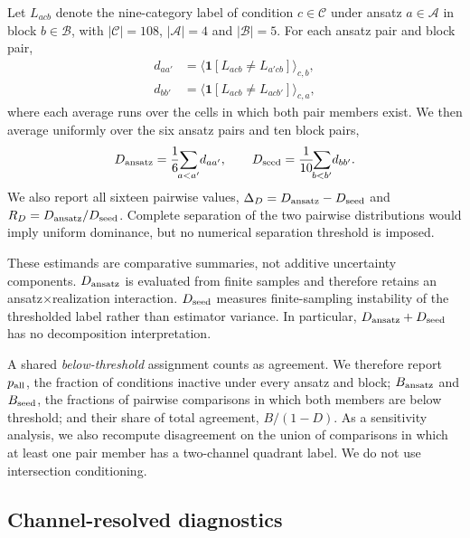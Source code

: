 \documentclass[aip,jap,reprint,superscriptaddress,longbibliography,floatfix]{revtex4-2}
\begin{document}
Let $L_{acb}$ denote the nine-category label of condition
$c\in\mathcal{C}$ under ansatz $a\in\mathcal{A}$ in block
$b\in\mathcal{B}$, with $|\mathcal{C}|=108$, $|\mathcal{A}|=4$ and
$|\mathcal{B}|=5$. For each ansatz pair and block pair,
%
\begin{align}
d_{aa'} &= \big\langle \mathbf{1}[L_{acb}\neq L_{a'cb}] \big\rangle_{c,b},
\nonumber\\
d_{bb'} &= \big\langle \mathbf{1}[L_{acb}\neq L_{acb'}] \big\rangle_{c,a},
\label{eq:pairwise-d}
\end{align}
%
where each average runs over the cells in which both pair members exist. We
then average uniformly over the six ansatz pairs and ten block pairs,
%
\begin{equation}
D_{\rm ansatz} = \frac{1}{6}\!\!\sum_{a<a'}\! d_{aa'},
\qquad
D_{\rm seed} = \frac{1}{10}\!\!\sum_{b<b'}\! d_{bb'} .
\label{eq:D}
\end{equation}
%
We also report all sixteen pairwise values,
$\Delta_D=D_{\rm ansatz}-D_{\rm seed}$ and
$R_D=D_{\rm ansatz}/D_{\rm seed}$. Complete separation of the two pairwise
distributions would imply uniform dominance, but no numerical separation
threshold is imposed.

These estimands are comparative summaries, not additive uncertainty
components. $D_{\rm ansatz}$ is evaluated from finite samples and therefore
retains an ansatz$\times$realization interaction. $D_{\rm seed}$ measures
finite-sampling instability of the thresholded label rather than estimator
variance. In particular, $D_{\rm ansatz}+D_{\rm seed}$ has no decomposition
interpretation.

A shared \emph{below-threshold} assignment counts as agreement. We therefore
report $p_{\rm all}$, the fraction of conditions inactive under every ansatz and
block; $B_{\rm ansatz}$ and $B_{\rm seed}$, the fractions of pairwise
comparisons in which both members are below threshold; and their share of total
agreement, $B/(1-D)$. As a sensitivity analysis, we also recompute
disagreement on the union of comparisons in which at least one pair member has
a two-channel quadrant label. We do not use intersection conditioning.

\subsection{Channel-resolved diagnostics}
\end{document}
